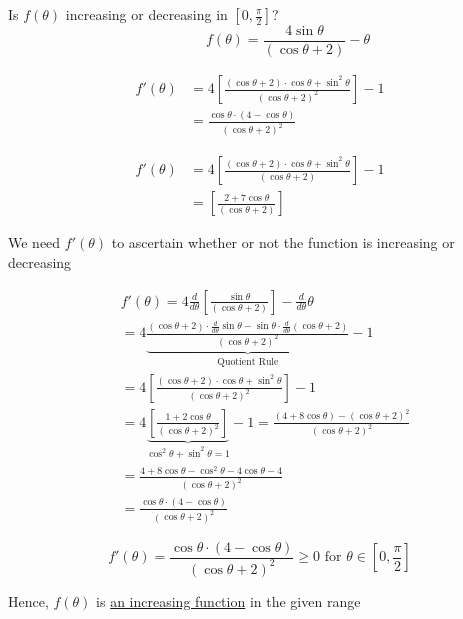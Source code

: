 \documentclass[14pt,fleqn]{extarticle}
\begin{document}
\newcommand\dnm{\left(\cos\theta + 2 \right)}
\newcommand\drv{\frac{\cos\theta\cdot \left(4-\cos\theta \right)}{\dnm^2}}

Is $f \left(\theta \right)$ increasing or decreasing in $ \left[0, \frac{\pi}{2} \right]$?
\[\qquad \qquad f \left(\theta \right) = \dfrac{4\sin\theta}{\dnm} - \theta\]
%

\newcard 

\begin{align}
	f' \left(\theta \right) &= 4 \left[\frac{\dnm\cdot \cos\theta + \sin^2\theta}{\dnm^2}\right]- 1  \\
	&= \frac{\cos\theta\cdot \left(4-\cos\theta \right)}{\dnm^2}
\end{align}

\newcard 

\begin{align}
	f' \left(\theta \right) &= 4 \left[\frac{\dnm\cdot\cos\theta  + \sin^2\theta}{\dnm}\right] - 1 \\
	&= \left[\frac{2 + 7\cos\theta}{\dnm} \right]
\end{align}

\newcard 

We need $f' \left(\theta \right)$ to ascertain whether or not the function is increasing or decreasing 

\begin{align}
&f'\left(\theta \right) = 4\frac{d}{d\theta} \left[\frac{\sin\theta}{\dnm}  \right] - \frac{d}{d\theta} \theta \\
&= 4 \underbrace{\frac{\dnm\cdot \frac{d}{d\theta}\sin\theta - \sin\theta\cdot \frac{d}{d\theta}\dnm}{\dnm^2}}_{\text{Quotient Rule}} - 1 \\
&= 4 \left[\frac{\dnm\cdot\cos\theta + \sin^2\theta}{\dnm^2} \right] - 1\\
&= 4 \underbrace{\left[\frac{1 + 2\cos\theta}{\dnm^2} \right]}_{\cos^2\theta + \sin^2\theta = 1} - 1 = \frac{\left(4 + 8\cos\theta \right) - \dnm^2}{\dnm^2} \\
&= \frac{4 + 8\cos\theta - \cos^2\theta - 4\cos\theta - 4}{\dnm^2} \\
&= \frac{\cos\theta\cdot \left(4-\cos\theta \right)}{\dnm^2}
\end{align}

\newcard 

\small\[ f' \left(\theta \right) = \drv \geq 0\text{ for } \theta\in \left[0,\frac{\pi}{2} \right]\]\normalsize

Hence, $f \left(\theta \right)$ is \underline{an increasing function} in the given range 
\end{document}
